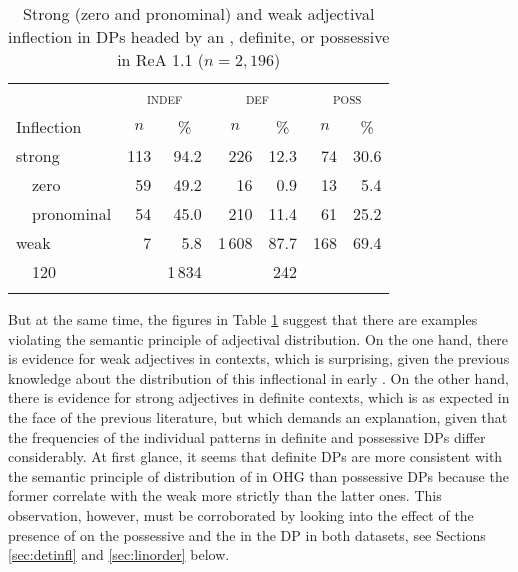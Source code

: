 \documentclass[output=paper,colorlinks,citecolor=brown]{langscibook}
\begin{document}
\begin{table}
\begin{tabular}{ll *3{rr}}
\lsptoprule
 & & \multicolumn{2}{c}{\textsc{indef}} & \multicolumn{2}{c}{\textsc{def}} & \multicolumn{2}{c}{\textsc{poss}}\\\cmidrule(lr){3-4}\cmidrule(lr){5-6}\cmidrule(lr){7-8}
\multicolumn{2}{l}{Inflection} & \multicolumn{1}{c}{$n$} & \multicolumn{1}{c}{\%}     & \multicolumn{1}{c}{$n$}   & \multicolumn{1}{c}{\%}     & \multicolumn{1}{c}{$n$} & \multicolumn{1}{c}{\%}\\\midrule
\multicolumn{2}{l}{strong}          & 113 & 94.2 &   226 & 12.3 &  74 & 30.6\\
              & zero                &  59 & 49.2 &    16 &  0.9 &  13 &  5.4\\
              & pronominal          &  54 & 45.0 &   210 & 11.4 &  61 & 25.2\\
\multicolumn{2}{l}{weak}            &   7 &  5.8 & 1\,608 & 87.7 & 168 & 69.4\\\addlinespace
\multicolumn{2}{l}{Total}           & 120 &        & 1\,834 &        & 242 & \\
\lspbottomrule
\end{tabular}
\caption{Strong (zero and pronominal) and weak adjectival inflection in
DPs headed by an , definite, or possessive  in ReA 1.1
($n=2{,}196$)}\label{ch6t1}
\end{table}




But at the same time, the figures in Table \ref{ch6t1} suggest that there are
examples violating the semantic principle of adjectival distribution. On
the one hand, there is evidence for weak adjectives in 
contexts, which is surprising, given the previous knowledge about the
distribution of this inflectional  in early . On the
other hand, there is evidence for strong adjectives in definite
contexts, which is as expected in the face of the previous literature,
but which demands an explanation, given that the frequencies of the individual
patterns in definite and possessive DPs differ considerably. At first
glance, it seems that definite DPs are more consistent with the semantic
principle of distribution of  in OHG than
possessive DPs because the former correlate with the weak 
more strictly than the latter ones. This observation, however, must be
corroborated by looking into the effect of the presence of  on
the possessive  and the  in the DP in both
datasets, see Sections \ref{sec:detinfl} and \ref{sec:linorder} below.
\end{document}

